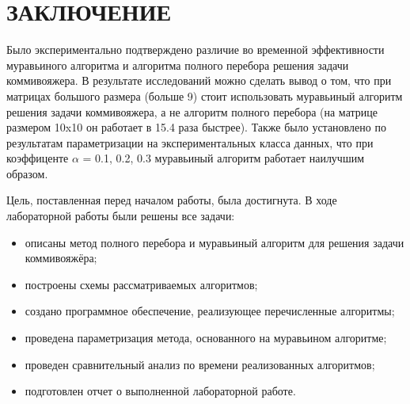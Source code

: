 \chapter*{\hfill{\centering ЗАКЛЮЧЕНИЕ}\hfill}


Было экспериментально подтверждено различие во временной эффективности муравьиного алгоритма и алгоритма полного перебора решения задачи коммивояжера.
В результате исследований можно сделать вывод о том, что при матрицах большого размера (больше 9) стоит использовать муравьиный алгоритм решения задачи коммивояжера, а не алгоритм полного перебора (на матрице размером 10x10 он работает в 15.4 раза быстрее).
Также было установлено по результатам параметризации на экспериментальных класса данных, что при коэффиценте $\alpha$ = 0.1, 0.2, 0.3 муравьиный алгоритм работает наилучшим образом.

Цель, поставленная перед началом работы, была достигнута. В ходе лабораторной работы были решены все задачи:

\begin{itemize}[label = ---]
	\item описаны метод полного перебора и муравьиный алгоритм для решения задачи коммивояжёра;
	\item построены схемы рассматриваемых алгоритмов;
	\item создано программное обеспечение, реализующее перечисленные алгоритмы;
	\item проведена параметризация метода, основанного на муравьином алгоритме;
	\item проведен сравнительный анализ по времени реализованных алгоритмов;
	\item подготовлен отчет о выполненной лабораторной работе.
\end{itemize}
